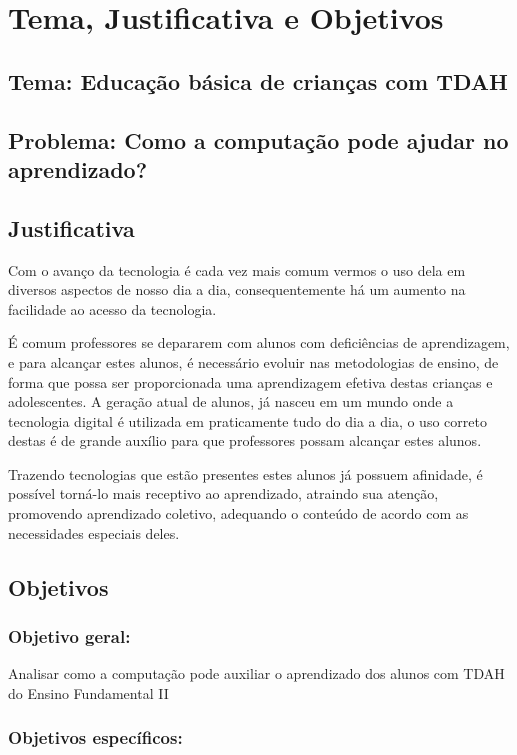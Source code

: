 \chapter{Tema, Justificativa e Objetivos}

\section*{Tema: Educação básica de crianças com TDAH}

\section*{Problema: Como a computação pode ajudar no aprendizado?}

\section{Justificativa}

Com o avanço da tecnologia é cada vez mais comum vermos o uso dela em diversos aspectos de nosso dia a dia, consequentemente há um aumento na facilidade ao acesso da tecnologia.

É comum professores se depararem com alunos com deficiências de aprendizagem, e para alcançar estes alunos, é necessário evoluir nas metodologias de ensino, de forma que possa ser proporcionada uma aprendizagem efetiva destas crianças e adolescentes. A geração atual de alunos, já nasceu em um mundo onde a tecnologia digital é utilizada em praticamente tudo do dia a dia, o uso correto destas é de grande auxílio para que professores possam alcançar estes alunos.

Trazendo tecnologias que estão presentes estes alunos já possuem afinidade, é possível torná-lo mais receptivo ao aprendizado, atraindo sua atenção, promovendo aprendizado coletivo, adequando o conteúdo de acordo com as necessidades especiais deles.

\section{Objetivos}

\subsection{Objetivo geral:} Analisar como a computação pode auxiliar o aprendizado dos alunos com TDAH do Ensino Fundamental II

\subsection{Objetivos específicos:}

